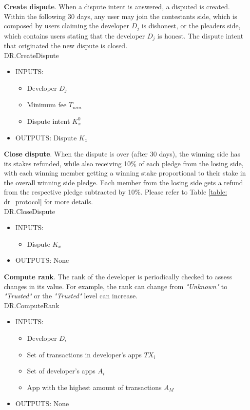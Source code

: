 \noindent \textbf{Create dispute}. When a dispute intent is answered, a disputed is created. Within the following 30 days, any user may join the contestants side, which is composed by users claiming the developer $D_j$ is dishonest, or the pleaders side, which contains users stating that the developer $D_j$ is honest. The dispute intent that originated the new dispute is closed.\\

\textsf{DR.CreateDispute}
\begin{itemize}
	\item INPUTS:
	\begin{itemize}
		\item Developer $D_j$
		\item Minimum fee $T_{min}$
		\item Dispute intent $K^{0}_{x}$
	\end{itemize}
	\item OUTPUTS: Dispute $K_x$
\end{itemize}

\noindent \textbf{Close dispute}. When the dispute is over (after 30 days), the winning side has its stakes refunded, while also receiving 10\% of each pledge from the losing side, with each winning member getting a winning stake proportional to their stake in the overall winning side pledge. Each member from the losing side gets a refund from the respective pledge subtracted by 10\%. Please refer to Table \ref{table: dr_protocol} for more details. \\

\textsf{DR.CloseDispute}
\begin{itemize}
	\item INPUTS:
	\begin{itemize}
		\item Dispute $K_x$
	\end{itemize}
	\item OUTPUTS: None
\end{itemize}

\noindent \textbf{Compute rank}. The rank of the developer is periodically checked to assess changes in its value. For example, the rank can change from \textit{"Unknown"} to \textit{"Trusted"} or the \textit{"Trusted"} level can increase. \\

\textsf{DR.ComputeRank}
\begin{itemize}
	\item INPUTS:
	\begin{itemize}
		\item Developer $D_i$
		\item Set of transactions in developer's apps $TX_i$
		\item Set of developer's apps $A_i$
		\item App with the highest amount of transactions $A_M$
	\end{itemize}
	\item OUTPUTS: None
\end{itemize}

